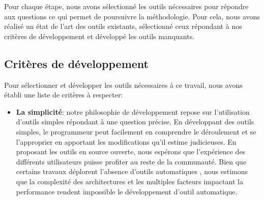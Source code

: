     Pour chaque étape, nous avons sélectionné les outils nécessaires pour répondre aux questions ce qui permet de poursuivre la méthodologie. Pour cela, nous avons réalisé un état de l'art des outils existants, sélectionné ceux répondant à nos critères de développement et développé les outils manquants.
    

        
\subsection{Critères de développement}
    
    Pour sélectionner et développer les outils nécessaires à ce travail, nous avons établi une liste de critères à respecter:
    \begin{itemize}
        \item \textbf{La simplicité}: notre philosophie de développement repose sur l'utilisation d'outils simples répondant à une question précise. En développant des outils simples, le programmeur peut facilement en comprendre le déroulement et se l'approprier en apportant les modifications qu'il estime judicieuses. En proposant les outils en source ouverte, nous espérons que l'expérience des différents utilisateurs puisse profiter au reste de la communauté. Bien que certains travaux déplorent l'absence d'outils automatiques \cite{Chung2012}, nous estimons que la complexité des architectures et les multiples facteurs impactant la performance rendent impossible le développement d'outil automatique.\\
        

\end{itemize}
